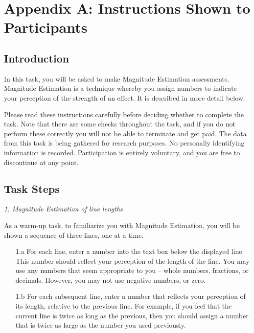 \section*{Appendix A: Instructions Shown to Participants}
\label{a-instructions}

\subsection*{Introduction}

In this task, you will be asked to make Magnitude Estimation
assessments. Magnitude Estimation is a technique whereby you assign
numbers to indicate your perception of the strength of an effect. It is
described in more detail below.

Please read these instructions carefully before deciding whether to
complete the task. Note that there are some checks throughout the task,
and if you do not perform these correctly you will not be able to
terminate and get paid. The data from this task is being gathered for
research purposes.  No personally identifying information is recorded.
Participation is entirely voluntary, and you are free to discontinue at
any point.


\subsection*{Task Steps}

\noindent \emph{1. Magnitude Estimation of line lengths}

As a warm-up task, to familiarize you with Magnitude Estimation, you
will be shown a sequence of three lines, one at a time. 

\begin{enumerate}
\item[1.a] For each line, enter a number into the text box below the displayed
line. This number should reflect your perception of the length of the
line.  You may use any numbers that seem appropriate to you -- whole
numbers, fractions, or decimals. However, you may not use negative
numbers, or zero. 

\item[1.b] For each subsequent line, enter a number that reflects your
perception of its length, relative to the previous line. For example,
if you feel that the current line is twice as long as the previous, then 
you should assign a number that is twice as large as the number you used
previously.
\end{enumerate}

